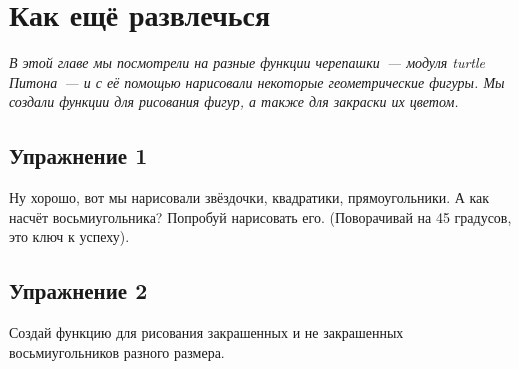 \section{Как ещё развлечься}

\emph{В этой главе мы посмотрели на разные функции черепашки — модуля turtle Питона — и с её помощью нарисовали некоторые геометрические фигуры. Мы создали функции для рисования фигур, а также для закраски их цветом.}

\subsection*{Упражнение 1}
Ну хорошо, вот мы нарисовали звёздочки, квадратики, прямоугольники. А как насчёт восьмиугольника? Попробуй нарисовать его. (Поворачивай на 45 градусов, это ключ к успеху).

\subsection*{Упражнение 2}
Создай функцию для рисования закрашенных и не закрашенных восьмиугольников разного размера.

\newpage
